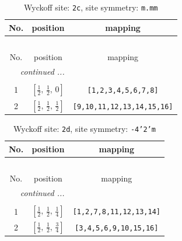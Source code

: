 \documentclass[fleqn,8pt]{jsarticle}
\begin{document}
\renewcommand{\arraystretch}{1.2}
\begin{longtable}{ccc}
\caption{Wyckoff site: {\tt 2c}, site symmetry: {\tt m.mm}}
 \\
 \hline \hline
No. & position & mapping \\ \hline \endfirsthead

\multicolumn{2}{l}{\tablename\ \thetable{}} \\
 \hline \hline
No. & position & mapping \\ \hline \endhead

 \hline \hline
\multicolumn{2}{r}{\footnotesize\it continued ...} \\ \endfoot

 \hline \hline
\multicolumn{2}{r}{} \\ \endlastfoot

1 & $\left[ \frac{1}{2},\, \frac{1}{2},\, 0 \right]$ & {\tt [1,2,3,4,5,6,7,8]} \\ \hline
2 & $\left[ \frac{1}{2},\, \frac{1}{2},\, \frac{1}{2} \right]$ & {\tt [9,10,11,12,13,14,15,16]} \\
\end{longtable}
\renewcommand{\arraystretch}{1.2}
\begin{longtable}{ccc}
\caption{Wyckoff site: {\tt 2d}, site symmetry: {\tt -4'2'm}}
 \\
 \hline \hline
No. & position & mapping \\ \hline \endfirsthead

\multicolumn{2}{l}{\tablename\ \thetable{}} \\
 \hline \hline
No. & position & mapping \\ \hline \endhead

 \hline \hline
\multicolumn{2}{r}{\footnotesize\it continued ...} \\ \endfoot

 \hline \hline
\multicolumn{2}{r}{} \\ \endlastfoot

1 & $\left[ \frac{1}{2},\, \frac{1}{2},\, \frac{1}{4} \right]$ & {\tt [1,2,7,8,11,12,13,14]} \\ \hline
2 & $\left[ \frac{1}{2},\, \frac{1}{2},\, \frac{3}{4} \right]$ & {\tt [3,4,5,6,9,10,15,16]} \\
\end{longtable}
\renewcommand{\arraystretch}{1.2}
\end{document}
